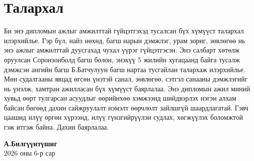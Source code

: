 
\chapter*{Талархал}

\noindent Би энэ дипломын ажлыг амжилттай гүйцэтгэхэд тусалсан бүх хүмүүст талархал илэрхийлье. Гэр бүл, найз нөхөд, багш нарын дэмжлэг, урам зориг, зөвлөгөө нь энэ ажлыг амжилттай дуусгахад чухал үүрэг гүйцэтгэсэн. Энэ салбарт хөтөлж оруулсан Соронзонболд багш болон, энэхүү 5 жилийн хугацаанд байга тусалж дэмжсэн ангийн багш Б.Батчулуун багш нартаа тусгайлан талархаж илэрхийлье. Мөн судалгааны явцад өгсөн үнэтэй санал, зөвлөгөө, сэтгэл санааны дэмжлэгийг нь үнэлж, хамтран ажилласан бүх хүмүүст баярлалаа. Энэ дипломын ажил миний хувьд өөрт тулгарсан асуудлыг өөрийнхөө хэмжээнд шийдвэрлэх нэгэн алхам байсан бөгөөд дахин сайжруулалт нэмэлт өөрчлөлт зайлшгүй шаардлагатай. Гэвч цаашид илүү өргөн хүрээнд, илүү гүнзгийрүүлэн судлах, хөгжүүлэх боломжтой гэж итгэж байна. Дахин баярлалаа.
\vspace{10mm}
\begin{flushright}
\textbf{А.Билгүүнтүшиг}\\
2026 оны 6-р сар
\end{flushright}